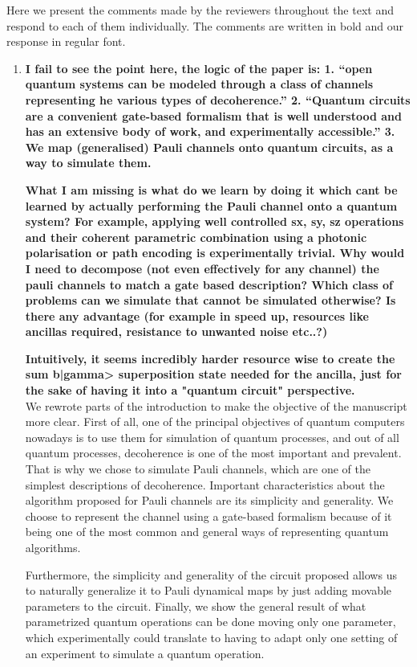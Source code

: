 \documentclass[10pt,letterpaper]{article} %
\begin{document}
Here we present the comments made by the reviewers throughout the text 
and respond to each of them individually.
The comments are written in bold and our response in regular font.

\begin{enumerate}
\item \textbf{I fail to see the point here, the logic of the paper is: 
1. ``open quantum systems can be modeled through a class of channels representing he various types of decoherence.'' 2. ``Quantum circuits are a convenient gate-based formalism that is well understood and has an extensive body of work, and experimentally accessible.''
3. We map (generalised) Pauli channels onto quantum circuits, as a way to simulate them.} 

\textbf{What I am missing is what do we learn by doing it which cant be learned by actually performing the Pauli channel onto a quantum system? For example, applying well controlled sx, sy, sz operations and their coherent parametric combination using a photonic polarisation or path encoding is experimentally trivial. Why would I need to decompose (not even effectively for any channel) the pauli channels to match a gate based description? Which class of problems can we simulate that cannot be simulated otherwise? Is there any advantage (for example in speed up, resources like ancillas required, resistance to unwanted noise etc..?)}

\textbf{Intuitively, it seems incredibly harder resource wise to create the sum b|gamma> superposition state needed for the ancilla, just for the sake of having it into a "quantum circuit" perspective. }\\


We rewrote parts of the introduction to make the objective of the manuscript more clear. 
First of all, one of the principal objectives of quantum computers nowadays
is to use them for simulation of quantum processes,
and out of all quantum processes, decoherence is one of the most important and prevalent.
That is why we chose to simulate Pauli channels, which are one of the
simplest descriptions of decoherence. 
Important characteristics about the algorithm proposed for Pauli channels
are its simplicity and generality.
We choose to represent the channel using a gate-based formalism because
of it being one of the most common and general ways of
representing quantum algorithms.

Furthermore, the simplicity and generality of the circuit proposed allows us to
naturally generalize it to Pauli dynamical maps by just
adding movable parameters to the circuit.
Finally, we show the general result of what parametrized quantum operations can be done 
moving only one parameter, which experimentally could translate
to having to adapt only one setting of an experiment
to simulate a quantum operation.





\end{enumerate}
\end{document}

